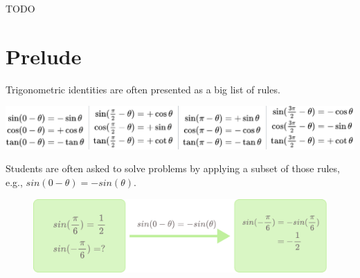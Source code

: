 \documentclass[12pt]{cmuthesis}
\makeatletter
\newcommand*{\eg}{e.g.\@\xspace}
\makeatother
\begin{document}
\begin{acknowledgments}
TODO
\end{acknowledgments}


\tableofcontents
\listoffigures
\listoftables

\mainmatter


%
%
%
%
%


\chapter*{Prelude}

\vspace{-30pt}

Trigonometric identities are often presented as a big list of rules. 

\noindent\includegraphics[width=\linewidth]{assets/prelude/trig-identities.pdf}


\noindent Students are often asked to solve problems by applying a subset of those rules, \eg, $sin(0 - \theta) = -sin(\theta)$.

\begin{figure}[h]
    \centering
    \includegraphics[width=0.75\linewidth]{assets/prelude/symbolic-transform.pdf}
\end{figure}
\end{document}
